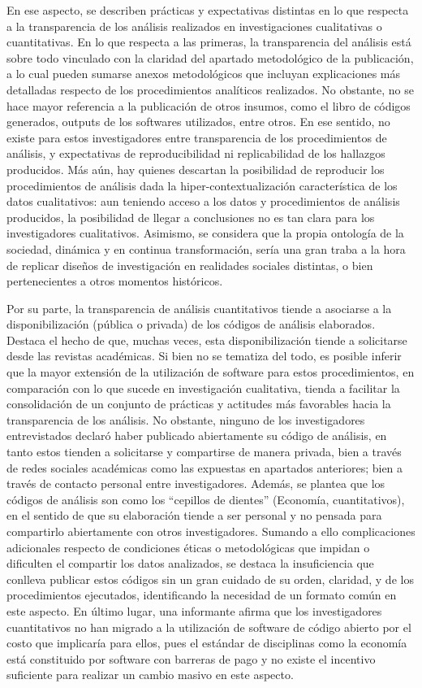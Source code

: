 \documentclass[
  letterpaper,
  DIV=11,
  numbers=noendperiod]{scrreprt}
\begin{document}
En ese aspecto, se describen prácticas y expectativas distintas en lo
que respecta a la transparencia de los análisis realizados en
investigaciones cualitativas o cuantitativas. En lo que respecta a las
primeras, la transparencia del análisis está sobre todo vinculado con la
claridad del apartado metodológico de la publicación, a lo cual pueden
sumarse anexos metodológicos que incluyan explicaciones más detalladas
respecto de los procedimientos analíticos realizados. No obstante, no se
hace mayor referencia a la publicación de otros insumos, como el libro
de códigos generados, outputs de los softwares utilizados, entre otros.
En ese sentido, no existe para estos investigadores entre transparencia
de los procedimientos de análisis, y expectativas de reproducibilidad ni
replicabilidad de los hallazgos producidos. Más aún, hay quienes
descartan la posibilidad de reproducir los procedimientos de análisis
dada la hiper-contextualización característica de los datos
cualitativos: aun teniendo acceso a los datos y procedimientos de
análisis producidos, la posibilidad de llegar a conclusiones no es tan
clara para los investigadores cualitativos. Asimismo, se considera que
la propia ontología de la sociedad, dinámica y en continua
transformación, sería una gran traba a la hora de replicar diseños de
investigación en realidades sociales distintas, o bien pertenecientes a
otros momentos históricos.

Por su parte, la transparencia de análisis cuantitativos tiende a
asociarse a la disponibilización (pública o privada) de los códigos de
análisis elaborados. Destaca el hecho de que, muchas veces, esta
disponibilización tiende a solicitarse desde las revistas académicas. Si
bien no se tematiza del todo, es posible inferir que la mayor extensión
de la utilización de software para estos procedimientos, en comparación
con lo que sucede en investigación cualitativa, tienda a facilitar la
consolidación de un conjunto de prácticas y actitudes más favorables
hacia la transparencia de los análisis. No obstante, ninguno de los
investigadores entrevistados declaró haber publicado abiertamente su
código de análisis, en tanto estos tienden a solicitarse y compartirse
de manera privada, bien a través de redes sociales académicas como las
expuestas en apartados anteriores; bien a través de contacto personal
entre investigadores. Además, se plantea que los códigos de análisis son
como los ``cepillos de dientes'' (Economía, cuantitativos), en el
sentido de que su elaboración tiende a ser personal y no pensada para
compartirlo abiertamente con otros investigadores. Sumando a ello
complicaciones adicionales respecto de condiciones éticas o
metodológicas que impidan o dificulten el compartir los datos
analizados, se destaca la insuficiencia que conlleva publicar estos
códigos sin un gran cuidado de su orden, claridad, y de los
procedimientos ejecutados, identificando la necesidad de un formato
común en este aspecto. En último lugar, una informante afirma que los
investigadores cuantitativos no han migrado a la utilización de software
de código abierto por el costo que implicaría para ellos, pues el
estándar de disciplinas como la economía está constituido por software
con barreras de pago y no existe el incentivo suficiente para realizar
un cambio masivo en este aspecto.
\end{document}
